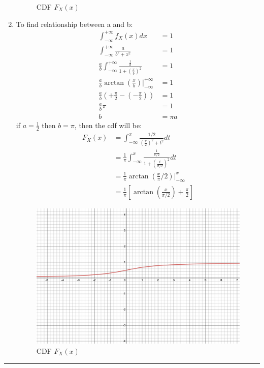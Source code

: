 \documentclass[12pt, letterpaper]{scrartcl}
\begin{document}
\begin{enumerate}[((a))]
\begin{figure}[H]
        \centering
        \caption{CDF $F_X(x)$}
    \end{figure}
    \item To find relationship between a and b:
    \begin{align*}
        \int^{+\infty}_{-\infty}f_X(x)dx&=1\\
        \int^{+\infty}_{-\infty}\frac{a}{b^2+x^2}&=1\\
        \frac{a}{b}\int^{+\infty}_{-\infty}\frac{\frac{1}{b}}{1+(\frac{x}{b})^2}&=1\\
        \frac{a}{b}\arctan(\frac{x}{b})\bigg\rvert^{+\infty}_{-\infty}&=1\\
        \frac{a}{b}(+\frac{\pi}{2}-(-\frac{\pi}{2}))&=1\\
        \frac{a}{b}\pi&=1\\
        b&=\pi a
    \end{align*}
    if $a=\frac{1}{2}$ then $b=\pi$, then the cdf will be:
    \begin{align*}
        F_X(x)&=\int_{-\infty}^{x}\frac{1/2}{(\frac{\pi}{2})^2+t^2}dt\\
        &=\frac{1}{\pi}\int_{-\infty}^{x}\frac{\frac{1}{\pi/2}}{1+(\frac{t}{\pi/2})^2}dt\\
        &=\frac{1}{\pi}\arctan(\frac{x}{\pi}/2)\bigg\rvert^{x}_{-\infty}\\
        &=\frac{1}{\pi}[\arctan(\frac{x}{\pi/2})+\frac{\pi}{2}]
    \end{align*}
    \begin{figure}[H]
        \includegraphics[width=0.7\linewidth]{hw2_figures/2.2b.png}
        \centering
        \caption{CDF $F_X(x)$}
    \end{figure}
\end{enumerate}
\hrule
\clearpage
\end{document}
